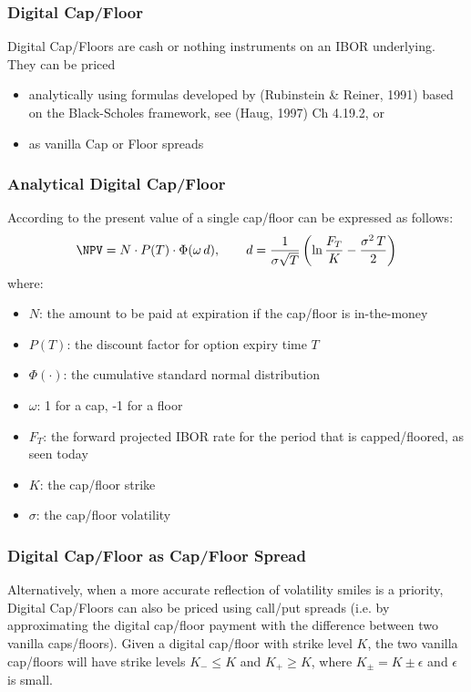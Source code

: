\subsubsection{Digital Cap/Floor}
\label{pricing:ir_digital}

Digital Cap/Floors are cash or nothing instruments on an IBOR underlying. 
They can be priced 
\begin{itemize}
\item analytically using formulas developed by (Rubinstein \& Reiner, 1991) 
based on the Black-Scholes framework, see (Haug, 1997) Ch 4.19.2, or
\item as vanilla Cap or Floor spreads
\end{itemize}

\subsubsection*{Analytical Digital Cap/Floor}

According to \cite{Rubinstein_1991} the present value of a single cap/floor 
can be expressed as follows:
$$
\NPV = N\cdot P(T) \cdot \Phi(\omega\,d), \qquad 
d = \frac{1}{\sigma\sqrt{T}}\left(\ln\frac{F_T}{K} - \frac{\sigma^2\,T}{2} \right)
$$
where:
\begin{itemize}
\item $N$: the amount to be paid at expiration if the cap/floor is in-the-money
\item $P(T)$: the discount factor for option expiry time $T$
\item $\Phi(\cdot)$: the cumulative standard normal distribution
\item $\omega$: 1 for a cap, -1 for a floor
\item $F_T$: the forward projected IBOR rate for the period that is capped/floored, as seen today
\item $K$: the cap/floor strike
\item $\sigma$: the cap/floor volatility
\end{itemize}

\subsubsection*{Digital Cap/Floor as Cap/Floor Spread}

Alternatively, when a more accurate reflection of volatility smiles is a priority, 
Digital Cap/Floors can also be priced using call/put spreads (i.e. by approximating 
the digital cap/floor payment with the difference between two vanilla caps/floors). 
Given a digital cap/floor with strike level $K$, the two vanilla cap/floors will 
have strike levels $K_- \leq K$ and  $K_+ \geq K$, where $K_\pm = K\pm\epsilon$ 
and $\epsilon$ is small.

